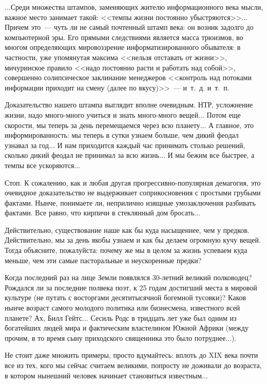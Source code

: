 \documentclass{scrbook}
\newcommand{\flqq}{<<}
\newcommand{\frqq}{>>}
\newcommand{\mdash}{~--- }
\begin{document}
...Среди множества штампов, заменяющих жителю информационного века мысли, важное место занимает такой: {\flqq}темпы жизни постоянно убыстряются{\frqq}... Причем это{\mdash}чуть ли не самый почтенный штамп века: он возник задолго до компьютерной эры. Его прямыми следствиями является масса трюизмов, во многом определяющих мировоззрение информатизированного обывателя: в частности, уже упомянутая максима {\flqq}нельзя отставать от жизни{\frqq}, мичуринское правило {\flqq}надо постоянно расти и работать над собой{\frqq}, совершенно солипсическое заклинание менеджеров {\flqq}контроль над потоками информации приходит на смену (далее по вкусу){\frqq}{\mdash}и~т.~д. и~т.~п.

Доказательство нашего штампа выглядит вполне очевидным. НТР, усложнение жизни, надо много-много учиться и знать много-много вещей... Потом еще скорости, мы теперь за день перемещаемся через всю планету... А главное, это информированность: мы теперь в сутки узнаем больше, чем дикий феодал узнавал за год... И нам приходится каждый час принимать столько решений, сколько дикий феодал не принимал за всю жизнь... И мы бежим все быстрее, а темпы все ускоряются...

Стоп. К сожалению, как и любая другая прогрессивно-популярная демагогия, это очевидное доказательство не выдерживает соприкосновения с простыми грубыми фактами. Нынче, понимаете ли, неприлично изящные умозаключения разбивать фактами. Все равно, что кирпичи в стеклянный дом бросать...

Действительно, существование наше как бы куда насыщеннее, чем у предков. Действительно, мы за день якобы узнаем и как бы делаем огромную кучу вещей. Тогда объясните, пожалуйста: почему же мы в целом за жизнь успеваем куда меньше, чем эти самые пасторальные и неускоренные предки?

Когда последний раз на лице Земли появлялся 30-летний великий полководец? Рождался ли за последние полвека поэт, к 25 годам достигший места в мировой культуре (не путать с восторгами десятитысячной богемной тусовки)? Каков нынче возраст самого молодого политика или бизнесмена, известного всей планете? Ах, Билл Гейтс... Сесиль Родс в тридцать лет уже был одним из богатейших людей мира и фактическим властелином Южной Африки (между прочим, в то время сыну приходского священника это было потруднее...).

Не стоит даже множить примеры, просто вдумайтесь: вплоть до XIX века почти все из тех, кого мы сейчас считаем великими, попросту не доживали до возраста, в котором нынешний человек начинает становиться известным...
\end{document}
